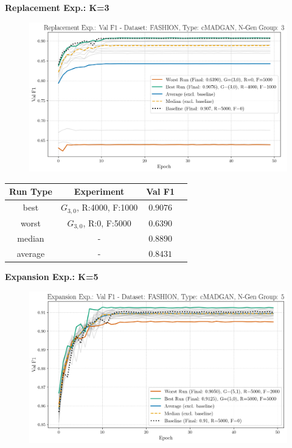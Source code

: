 \noindent\textbf{Replacement Exp.: K=3}
\begin{figure}[htbp]
	\centering
	\includegraphics[width=.85\textwidth]{abb/strat_classifier_performance/FASHION_STRATIFIED_CLASSIFIERS_cMADGAN_NEW/replacement_experiments/val_f1_score_cMADGAN_FASHION_n_gen_3_all.png}
	\label{fig:app_strat_class_performance_replacement_exp._val_f1_score_3}
\end{figure}
\begin{table}[H]
	\vspace{-1em}
	\centering
	\begin{tabular}{|c|c|c|c|}
		\hline
		Run Type & Experiment & Val F1 \\ \hline
		best & \(G_{3, 0}\), R:4000, F:1000 & $0.9076$\\ \hline
		worst & \(G_{3, 0}\), R:0, F:5000 & $0.6390$\\ \hline
		median & - & $0.8890$\\ \hline
		average & - & $0.8431$
		\\ \hline
	\end{tabular}
\end{table}
\newpage
\noindent\textbf{Expansion Exp.: K=5}
\begin{figure}[htbp]
	\centering
	\includegraphics[width=.85\textwidth]{abb/strat_classifier_performance/FASHION_STRATIFIED_CLASSIFIERS_cMADGAN_NEW/expansion_experiments/val_f1_score_cMADGAN_FASHION_n_gen_5_all.png}
	\label{fig:app_strat_class_performance_expansion_exp._val_f1_score_5}
\end{figure}
